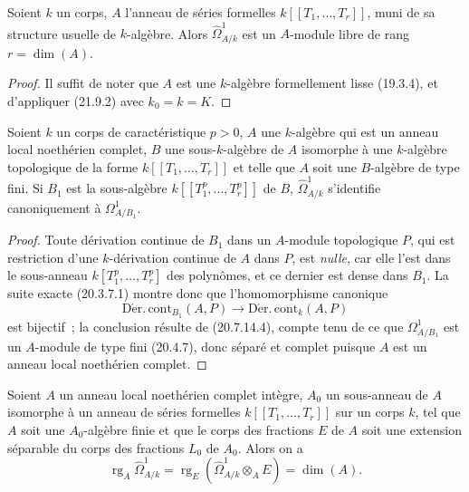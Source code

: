 \begin{corollary}[21.9.3]
\label{0.21.9.3-fr}
Soient $k$ un corps, $A$ l'anneau de séries formelles
$k[[T_1,\ldots,T_r]]$, muni de sa structure usuelle de $k$-algèbre. Alors
$\widehat\Omega^1_{A/k}$ est un $A$-module libre de rang $r=\dim(A)$.
\end{corollary}

\begin{proof}
Il suffit de noter que $A$ est une $k$-algèbre formellement lisse (19.3.4),
et d'appliquer (21.9.2) avec $k_0=k=K$.
\end{proof}

\begin{lemma}[21.9.4]
\label{0.21.9.4-fr}
Soient $k$ un corps de caractéristique $p>0$, $A$ une $k$-algèbre qui est un
anneau local noethérien complet, $B$ une sous-$k$-algèbre de $A$ isomorphe à
une $k$-algèbre topologique de la forme $k[[T_1,\ldots,T_r]]$ et telle que
$A$ soit une $B$-algèbre de type fini. Si $B_1$ est la sous-algèbre
$k[[T_1^p,\ldots,T_r^p]]$ de $B$, $\widehat\Omega^1_{A/k}$ s'identifie
canoniquement à $\Omega^1_{A/B_1}$.
\end{lemma}

\begin{proof}
Toute dérivation continue de $B_1$ dans un $A$-module topologique $P$, qui
est restriction d'une $k$-dérivation continue de $A$ dans $P$, est \emph{nulle},
car elle l'est dans le sous-anneau $k[T_1^p,\ldots,T_r^p]$ des polynômes, et
ce dernier est dense dans $B_1$. La suite exacte (20.3.7.1) montre donc que
l'homomorphisme canonique
\[
  \operatorname{D\acute{e}r.\,cont}_{B_1}(A,P)
  \longrightarrow \operatorname{D\acute{e}r.\,cont}_k(A,P)
\]
est bijectif~; la conclusion résulte de (20.7.14.4), compte tenu de ce que
$\Omega^1_{A/B_1}$ est un $A$-module de type fini (20.4.7), donc séparé et
complet puisque $A$ est un anneau local noethérien complet.
\end{proof}

\begin{proposition}[21.9.5]
\label{0.21.9.5-fr}
Soient $A$ un anneau local noethérien complet intègre, $A_0$ un sous-anneau
de $A$ isomorphe à un anneau de séries formelles $k[[T_1,\ldots,T_r]]$ sur
un corps $k$, tel que $A$ soit une $A_0$-algèbre \textup{finie} et que le corps des
fractions $E$ de $A$ soit une extension \textup{séparable} du corps des fractions
$L_0$ de $A_0$. Alors on a
\begin{equation}
\tag{21.9.5.1}
\label{0.21.9.5.1-fr}
  \operatorname{rg}_A\widehat\Omega^1_{A/k}
  =\operatorname{rg}_E(\widehat\Omega^1_{A/k}\otimes_AE)=\dim(A).
\end{equation}
\end{proposition}

